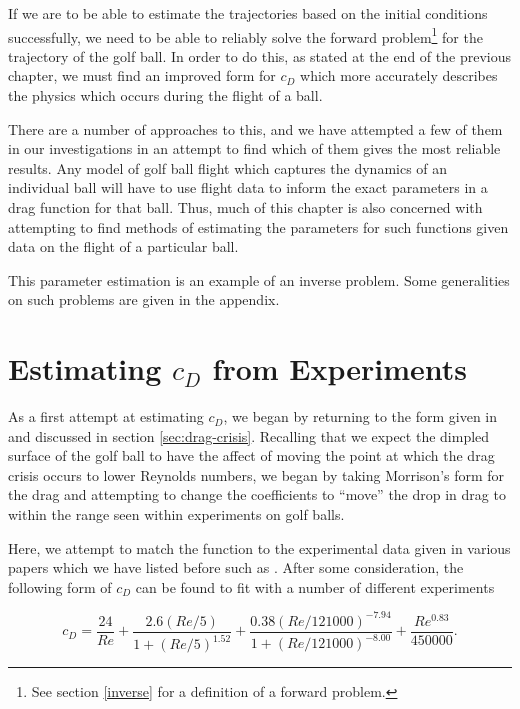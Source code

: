 If we are to be able to estimate the trajectories based on the initial conditions successfully, we
need to be able to reliably solve the forward problem\footnote{See section \ref{inverse} for a definition
of a forward problem.} for the trajectory of the golf ball. In order
to do this, as stated at the end of the previous chapter, we must find an improved form for $c_D$ which
more accurately describes the physics which occurs during the flight of a ball.

There are a number of approaches to this, and we have attempted a few of them in our investigations
in an attempt to find which of them gives the most reliable results. Any model of golf ball flight which
captures the dynamics of an individual ball will have to use flight data to inform the exact parameters
in a drag function for that ball. Thus, much of this chapter is also concerned with attempting to find 
methods of estimating the parameters for such functions given data on the flight of a particular ball.

This parameter estimation is an example of an inverse problem. Some generalities on such problems are
given in the appendix.

\section{Estimating $c_{D}$ from Experiments} \label{morrison}

As a first attempt at estimating $c_D$, we began by returning to the form given in \citet{Morrison2010}
and discussed in section \ref{sec:drag-crisis}. Recalling that we expect the dimpled surface of the
golf ball to have the affect of moving the point at which the drag crisis occurs to lower Reynolds
numbers, we began by taking Morrison's form for the drag and attempting to change the coefficients to
``move'' the drop in drag to within the range seen within experiments on golf balls.

Here, we attempt to match the function to the experimental data given in various papers which we
have listed before such as \citet{Bearman1976,Alam2011}. After some consideration, the following form of $c_D$ can be found to fit
with a number of different experiments

\begin{equation} \label{drag-m-mod}
c_D = \frac{24}{Re} + \frac{2.6(Re/5)}{1 + (Re/5)^{1.52}} + \frac{0.38(Re/121000)^{-7.94}}{1+(Re/121000)^{-8.00}}
+ \frac{Re^{0.83}}{450000} .
\end{equation}

